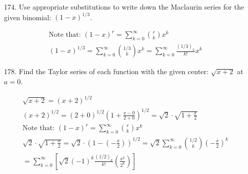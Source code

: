     \begin{itemize}
        \item [174.] Use appropriate substitutions to write down the Maclaurin series for the given binomial: $(1-x)^{1/3}$.
        \\
        \begin{mdframed}
            \begin{equation*}
                \begin{gathered}
                    \text{Note that: } (1-x)^{r} = 
                    \sum_{k=0}^{\infty}{r\choose k}x^{k}      \\
                    (1-x)^{1/3} = \sum_{k=0}^{\infty}{1/3 \choose k}x^{k} =
                    \boxed{\sum_{k=0}^{\infty}\frac{(1/3)_{k}}{k!}x^{k}}
                \end{gathered}
            \end{equation*}
        \end{mdframed}

        \item [178.] Find the Taylor series of each function with the given center: $\sqrt{x+2}$ at $a = 0$.
        \\
        \begin{mdframed}
            \begin{equation*}
                \begin{gathered}
                    \sqrt{x+2} = (x+2)^{1/2}                            \\
                    (x+2)^{1/2} = 
                    (2+0)^{1/2}\left(1+\frac{x-0}{2+0}\right)^{1/2} =
                    \sqrt{2}\cdot\sqrt{1+\frac{x}{2}}                   \\
                    \text{Note that: } (1-x)^{r} = 
                    \sum_{k=0}^{\infty}{r\choose k}x^{k}                \\
                    \sqrt{2}\cdot\sqrt{1+\frac{x}{2}} =
                    \sqrt{2}\cdot\left(1-\left(-\frac{x}{2}\right)\right)^{1/2} =
                    \sqrt{2}\sum_{k=0}^{\infty}
                    {1/2\choose k}\left(-\frac{x}{2}\right)^{k}         \\
                    = \boxed{\sum_{k=0}^{\infty}\left[\sqrt{2}(-1)^{k}
                    \frac{(1/2)_{k}}{k!}\left(\frac{x^k}{2^{k}}\right)\right]}
                \end{gathered}
            \end{equation*}
        \end{mdframed}


\end{itemize}
